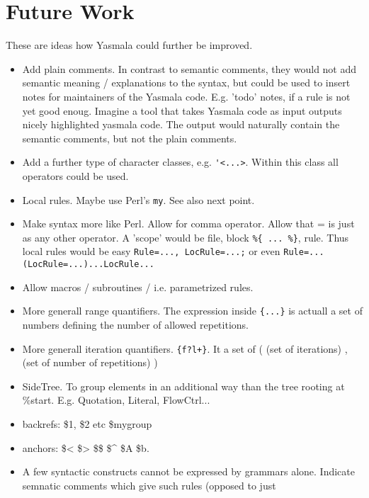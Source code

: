 \documentclass[a4paper]{report}
\begin{document}
\chapter{Future Work}

These are ideas how Yasmala could further be improved.

\begin{itemize}
\item Add plain comments. In contrast to semantic comments, they would not add
      semantic meaning / explanations to the syntax, but could be used to insert
      notes for maintainers of the Yasmala code. E.g. 'todo' notes, if a rule is
      not yet good enoug. Imagine a tool that takes Yasmala code as input
      outputs nicely highlighted yasmala code. The output would naturally
      contain the semantic comments, but not the plain comments.
\item Add a further type of character classes, e.g. \verb|'<...>|. Within this
      class all operators could be used. 
\item Local rules. Maybe use Perl's \verb|my|. See also next point.
\item Make syntax more like Perl. Allow for comma operator. Allow that = is just
      as any other operator. A 'scope' would be file, block \verb|%{ ... %}|, rule.
      Thus local rules would be easy \verb|Rule=..., LocRule=...;| or even
      \verb|Rule=...(LocRule=...)...LocRule...|
\item Allow macros / subroutines / i.e. parametrized rules.
\item More generall range quantifiers. The expression inside \verb|{...}| is
      actuall a set of numbers defining the number of allowed repetitions. 
\item More generall iteration quantifiers. \verb"{f?l+}". It a set of ( (set of
      iterations) , (set of number of repetitions) )
\item SideTree. To group elements in an additional way than the tree rooting
      at \%start. E.g. Quotation, Literal, FlowCtrl...
\item backrefs: \$1, \$2 etc \$mygroup
\item anchors: \$< \$> \$\$ \$^ \$A \$b.  
\item A few syntactic constructs cannot be expressed by grammars alone. 
      Indicate semnatic comments which give such rules (opposed to just

\end{itemize}
\end{document}
